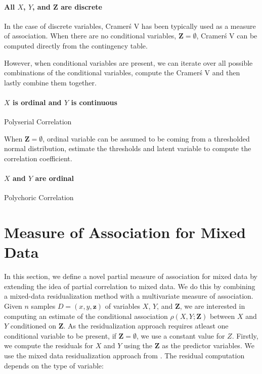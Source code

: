 \documentclass[letterpaper]{article} %
\begin{document}
\paragraph{All $ X $, $ Y $, and $ \bm{Z} $ are discrete}

In the case of discrete variables, Cramer\'s V has been typically used as a
measure of association. When there are no conditional variables, $ \bm{Z} = \emptyset $,
Cramer\'s V can be computed directly from the contingency table.

However, when conditional variables are present, we can iterate over all
possible combinations of the conditional variables, compute the Cramer\'s V and
then lastly combine them together. 


\paragraph{$ X $ is ordinal and $ Y $ is continuous}
Polyserial Correlation

When $ \bm{Z} = \emptyset $, ordinal variable can be assumed to be coming from
a thresholded normal distribution, estimate the thresholds and latent variable
to compute the correlation coefficient.

\paragraph{$ X $ and $ Y $ are ordinal}
Polychoric Correlation

\section{Measure of Association for Mixed Data}
\label{sec:mixed_association}

In this section, we define a novel partial measure of association for mixed
data by extending the idea of partial correlation to mixed data. We do this by
combining a mixed-data residualization method with a multivariate measure of
association. Given $ n $ samples $ D = (x, y, \bm{z}) $ of variables $ X $, $ Y $,
and $ \bm{Z} $, we are interested in computing an estimate of the conditional
association $ \rho(X, Y; \bm{Z}) $ between $ X $ and $ Y $ conditioned on $
\bm{Z} $. As the residualization approach requires atleast one conditional
variable to be present, if $ \bm{Z} = \emptyset $, we use a constant value for
$ Z $. Firstly, we compute the residuals for $ X $ and $ Y $ using the $ \bm{Z}
$ as the predictor variables. We use the mixed data residualization approach
from \citet{Ankan2023}. The residual computation depends on the type of 
variable:
\end{document}
